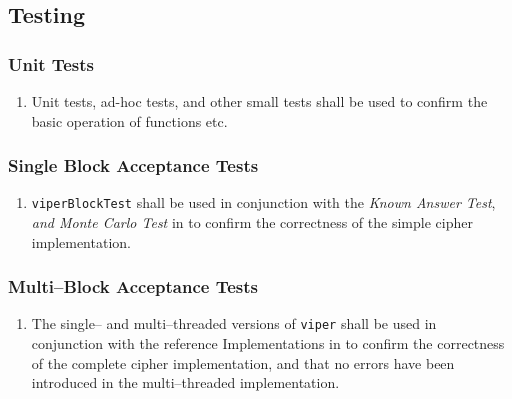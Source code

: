 \subsection{Testing}

\subsubsection{Unit Tests}
\begin{enumerate}
\item Unit tests, ad-hoc tests, and other small tests shall be used to confirm the basic operation of functions etc.
\end{enumerate}


\subsubsection{Single Block Acceptance Tests}
\begin{enumerate}
\item \texttt{viperBlockTest} shall be used in conjunction with the \emph{Known Answer Test}, \emph{and Monte Carlo Test} in \cite{submission-files} to confirm the correctness of the simple cipher implementation.
\end{enumerate}

\subsubsection{Multi--Block Acceptance Tests}
\begin{enumerate}
\item The single-- and multi--threaded versions of \texttt{viper} shall be used in conjunction with the reference Implementations in \cite{submission-files, referenceImplementation} to confirm the correctness of the complete cipher implementation, and that no errors have been introduced in the multi--threaded implementation.
\end{enumerate}

